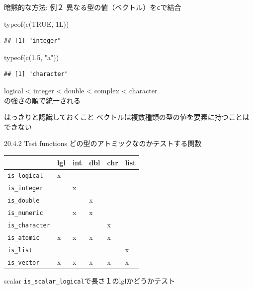 \documentclass[
  ignorenonframetext,
]{beamer}
\newenvironment{Shaded}{\begin{snugshade}}{\end{snugshade}}
\newcommand{\ConstantTok}[1]{\textcolor[rgb]{0.00,0.00,0.00}{#1}}
\newcommand{\FloatTok}[1]{\textcolor[rgb]{0.00,0.00,0.81}{#1}}
\newcommand{\FunctionTok}[1]{\textcolor[rgb]{0.00,0.00,0.00}{#1}}
\newcommand{\NormalTok}[1]{#1}
\newcommand{\StringTok}[1]{\textcolor[rgb]{0.31,0.60,0.02}{#1}}
\begin{document}
\begin{frame}[fragile]{暗黙的な方法: 例２}
\protect\hypertarget{ux6697ux9ed9ux7684ux306aux65b9ux6cd5-ux4f8buxff12}{}
異なる型の値（ベクトル）を\texttt{c}で結合

\begin{Shaded}
\begin{Highlighting}[]
\FunctionTok{typeof}\NormalTok{(}\FunctionTok{c}\NormalTok{(}\ConstantTok{TRUE}\NormalTok{, 1L))}
\end{Highlighting}
\end{Shaded}

\begin{verbatim}
## [1] "integer"
\end{verbatim}

\begin{Shaded}
\begin{Highlighting}[]
\FunctionTok{typeof}\NormalTok{(}\FunctionTok{c}\NormalTok{(}\FloatTok{1.5}\NormalTok{, }\StringTok{"a"}\NormalTok{))}
\end{Highlighting}
\end{Shaded}

\begin{verbatim}
## [1] "character"
\end{verbatim}

logical \textless{} integer \textless{} double \textless{} complex
\textless{} character\\
の強さの順で統一される

\begin{block}{はっきりと認識しておくこと}
\protect\hypertarget{ux306fux3063ux304dux308aux3068ux8a8dux8b58ux3057ux3066ux304aux304fux3053ux3068}{}
ベクトルは複数種類の型の値を要素に持つことはできない
\end{block}
\end{frame}

\begin{frame}[fragile]{20.4.2 Test functions}
\protect\hypertarget{test-functions}{}
どの型のアトミックなのかテストする関数

\begin{longtable}[]{@{}llllll@{}}
\toprule()
& lgl & int & dbl & chr & list \\
\midrule()
\endhead
\texttt{is\_logical} & x & & & & \\
\texttt{is\_integer} & & x & & & \\
\texttt{is\_double} & & & x & & \\
\texttt{is\_numeric} & & x & x & & \\
\texttt{is\_character} & & & & x & \\
\texttt{is\_atomic} & x & x & x & x & \\
\texttt{is\_list} & & & & & x \\
\texttt{is\_vector} & x & x & x & x & x \\
\bottomrule()
\end{longtable}

\begin{block}{scalar}
\protect\hypertarget{scalar}{}
\texttt{is\_scalar\_logical}で長さ１のlglかどうかテスト
\end{block}
\end{frame}
\end{document}
